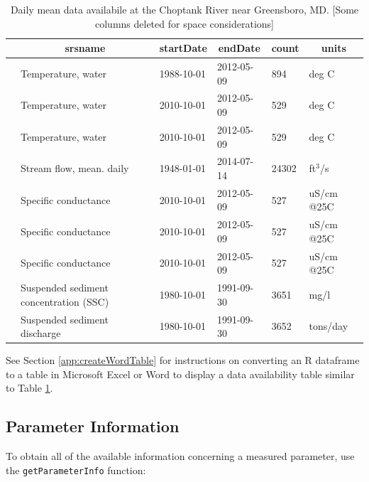 \documentclass[a4paper,11pt]{article}\usepackage[]{graphicx}\usepackage[]{color}
\begin{document}
\begin{table}[ht]
\caption{Daily mean data availabile at the Choptank River near Greensboro, MD. [Some columns deleted for space considerations]} 
\label{tab:gda}
{\footnotesize
\begin{tabular}{rlllll}
  \hline
 & \multicolumn{1}{c}{\textbf{\textsf{srsname}}} & \multicolumn{1}{c}{\textbf{\textsf{startDate}}} & \multicolumn{1}{c}{\textbf{\textsf{endDate}}} & \multicolumn{1}{c}{\textbf{\textsf{count}}} & \multicolumn{1}{c}{\textbf{\textsf{units}}} \\ 
  \hline
 & Temperature, water & 1988-10-01 & 2012-05-09 & 894 & deg C \\ 
  [5pt] & Temperature, water & 2010-10-01 & 2012-05-09 & 529 & deg C \\ 
  [5pt] & Temperature, water & 2010-10-01 & 2012-05-09 & 529 & deg C \\ 
  [5pt] & Stream flow, mean. daily & 1948-01-01 & 2014-07-14 & 24302 & ft$^3$/s \\ 
  [5pt] & Specific conductance & 2010-10-01 & 2012-05-09 & 527 & uS/cm @25C \\ 
  [5pt] & Specific conductance & 2010-10-01 & 2012-05-09 & 527 & uS/cm @25C \\ 
  [5pt] & Specific conductance & 2010-10-01 & 2012-05-09 & 527 & uS/cm @25C \\ 
  [5pt] & Suspended sediment concentration (SSC) & 1980-10-01 & 1991-09-30 & 3651 & mg/l \\ 
  [5pt] & Suspended sediment discharge & 1980-10-01 & 1991-09-30 & 3652 & tons/day \\ 
   \hline
\end{tabular}
}
\end{table}


See Section \ref{app:createWordTable} for instructions on converting an R dataframe to a table in Microsoft Excel or Word to display a data availability table similar to Table \ref{tab:gda}.

\FloatBarrier

\subsection{Parameter Information}
\label{sec:usgsParams}
To obtain all of the available information concerning a measured parameter, use the \texttt{getParameterInfo} function:
\end{document}
